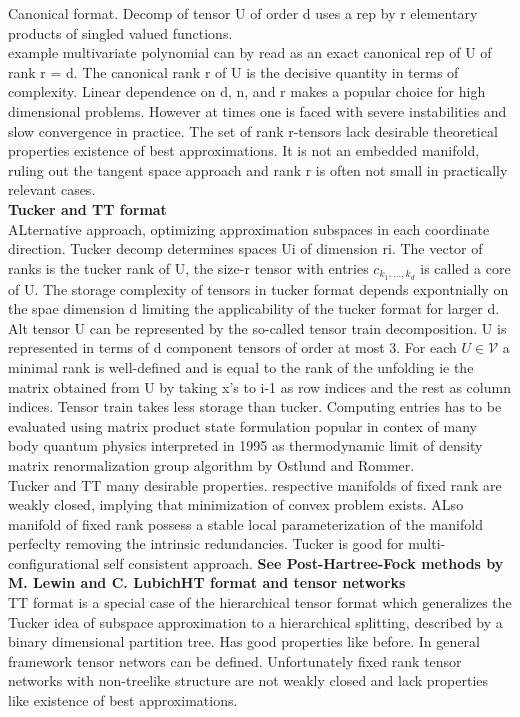 \documentclass[10pt, draft]{article}
\begin{document}
Canonical format. Decomp of tensor U of order d uses a rep by r elementary products of singled valued functions.\\
example multivariate polynomial can by read as an exact canonical rep of U of rank r = d.  The canonical rank r of U is the decisive quantity in terms of complexity.  Linear dependence on d, n, and r makes a popular choice for high dimensional problems.  However at times one is faced with severe instabilities and slow convergence in practice.  The set of rank r-tensors lack desirable theoretical properties existence of best approximations. It is not an embedded manifold, ruling out the tangent space approach and rank r is often not small in practically relevant cases.\\
\textbf{Tucker and TT format}\\
ALternative approach, optimizing approximation subspaces in each coordinate direction.  Tucker decomp determines spaces Ui of dimension ri.  The vector of ranks is the tucker rank of U, the size-r tensor with entries $c_{k_1,...,k_d}$ is called a core of U.  The storage complexity of tensors in tucker format depends expontnially on the spae dimension d limiting the applicability of the tucker format for larger d.\\
Alt tensor U can be represented by the so-called tensor train decomposition.  U is represented in terms of d component tensors of order at most 3.  For each $U \in \mathcal{V}$ a minimal rank is well-defined and is equal to the rank of the unfolding ie the matrix obtained from U by taking x's to i-1 as row indices and the rest as column indices.  Tensor train takes less storage than tucker.  Computing entries has to be evaluated using matrix product state formulation popular in contex of many body quantum physics interpreted in 1995 as thermodynamic limit of density matrix renormalization group algorithm by Ostlund and Rommer.  \\
Tucker and TT many desirable properties.  respective manifolds of fixed rank are weakly closed, implying that minimization of convex problem exists.  ALso manifold of fixed rank possess a stable local parameterization of the manifold perfeclty removing the intrinsic redundancies.  Tucker is good for multi-configurational self consistent approach.  \linebreak[1]
\textbf{See Post-Hartree-Fock methods by M. Lewin and C. Lubich}\linebreak[1]
\textbf{HT format and tensor networks}\\
TT format is a special case of the hierarchical tensor format which generalizes the Tucker idea of subspace approximation to a hierarchical splitting, described by a binary dimensional partition tree.  Has good properties like before.  In general framework tensor networs can be defined. Unfortunately fixed rank tensor networks with non-treelike structure are not weakly closed and lack properties like existence of best approximations.  \linebreak[1]
\end{document}
